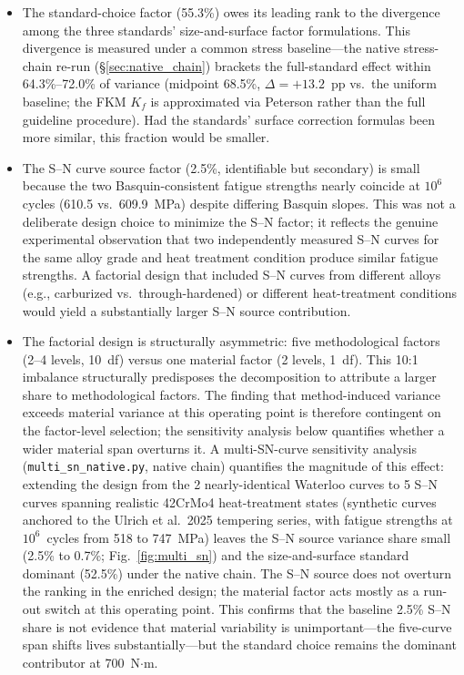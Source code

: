 \documentclass[twocolumn,12pt,a4paper]{article}
\begin{document}
\begin{itemize}
  \item The standard-choice factor (55.3\%) owes its leading rank to the
        divergence among the three standards' size-and-surface factor
        formulations. This divergence is measured under a common stress
        baseline---the native stress-chain re-run
        (\S\ref{sec:native_chain}) brackets the full-standard effect
        within 64.3\%--72.0\% of variance (midpoint 68.5\%,
        $\Delta=+13.2$~pp vs.\ the uniform baseline; the FKM $K_f$ is
        approximated via Peterson rather than the full guideline
        procedure). Had the standards' surface
        correction formulas been more similar, this fraction would be
        smaller.

  \item The S--N curve source factor (2.5\%, identifiable but
        secondary) is small because the two Basquin-consistent
        fatigue strengths nearly coincide at $10^6$ cycles (610.5 vs.\
        609.9~MPa) despite differing Basquin slopes.
        This was not a deliberate design choice to minimize the S--N
        factor; it reflects the genuine experimental observation that two
        independently measured S--N curves for the same alloy grade and
        heat treatment condition produce similar fatigue strengths.
        A factorial design that included S--N curves from
        different alloys (e.g., carburized vs.\ through-hardened) or
        different heat-treatment conditions would yield a substantially
        larger S--N source contribution.

  \item The factorial design is structurally asymmetric: five
        methodological factors (2--4 levels, 10~df) versus one
        material factor (2 levels, 1~df). This 10:1 imbalance
        structurally predisposes the decomposition to attribute a
        larger share to methodological factors. The finding that
        method-induced variance exceeds material variance at this
        operating point is therefore contingent on the factor-level
        selection; the sensitivity analysis below quantifies whether
        a wider material span overturns it.
        A multi-SN-curve sensitivity analysis
        (\texttt{multi\_sn\_native.py}, native chain)
        quantifies the magnitude
        of this effect: extending the design from the 2 nearly-identical
        Waterloo curves to 5 S--N curves spanning realistic 42CrMo4
        heat-treatment states (synthetic curves anchored to the
        Ulrich et al.\ 2025 tempering series, with fatigue strengths
        at $10^6$~cycles from 518 to 747~MPa) leaves the S--N source
        variance share small (2.5\% to 0.7\%;
        Fig.~\ref{fig:multi_sn}) and the size-and-surface standard
        dominant (52.5\%) under the native chain. The S--N source does
        not overturn the ranking in the enriched design; the material
        factor acts mostly as a run-out switch at this operating
        point. This confirms that the baseline
        2.5\% S--N share is not evidence that material
        variability is unimportant---the five-curve span shifts lives
        substantially---but the standard choice remains the dominant
        contributor at 700~N$\cdot$m.


\end{itemize}
\end{document}
